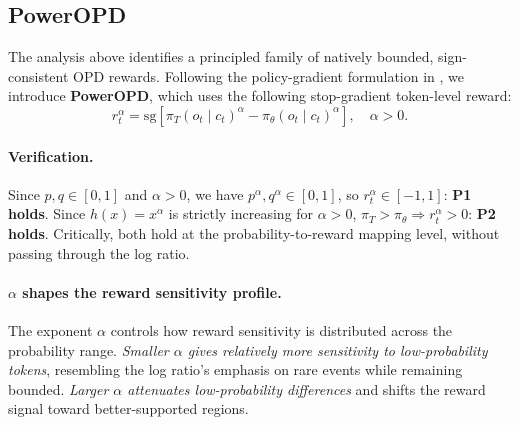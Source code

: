 \subsection{PowerOPD}
\label{sec:poweropd}

The analysis above identifies a principled family of natively bounded, sign-consistent OPD rewards. Following the policy-gradient formulation in , we introduce \textbf{PowerOPD}, which uses the following stop-gradient token-level reward:
\begin{equation}
  r_t^{\alpha} = \mathrm{sg}\!\left[\pi_T(o_t \mid c_t)^{\alpha} - \pi_\theta(o_t \mid c_t)^{\alpha}\right], \quad \alpha > 0.
  \label{eq:poweropd}
\end{equation}

\paragraph{Verification.}
Since \(p,q\in[0,1]\) and \(\alpha>0\), we have \(p^\alpha,q^\alpha\in[0,1]\), so \(r_t^\alpha\in[-1,1]\): \textbf{P1 holds}.
Since \(h(x)=x^\alpha\) is strictly increasing for \(\alpha>0\), \(\pi_T>\pi_\theta \Rightarrow r_t^\alpha>0\): \textbf{P2 holds}.
Critically, both hold at the probability-to-reward mapping level, without passing through the log ratio.

\paragraph{\(\alpha\) shapes the reward sensitivity profile.}
The exponent \(\alpha\) controls how reward sensitivity is distributed across the probability range. \emph{Smaller \(\alpha\) gives relatively more sensitivity to low-probability tokens}, resembling the log ratio's emphasis on rare events while remaining bounded. \emph{Larger \(\alpha\) attenuates low-probability differences} and shifts the reward signal toward better-supported regions.